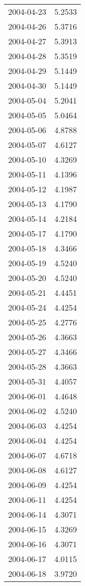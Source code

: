 \begin{tabular}{lr}
2004-04-23 &      5.2533 \\
2004-04-26 &      5.3716 \\
2004-04-27 &      5.3913 \\
2004-04-28 &      5.3519 \\
2004-04-29 &      5.1449 \\
2004-04-30 &      5.1449 \\
2004-05-04 &      5.2041 \\
2004-05-05 &      5.0464 \\
2004-05-06 &      4.8788 \\
2004-05-07 &      4.6127 \\
2004-05-10 &      4.3269 \\
2004-05-11 &      4.1396 \\
2004-05-12 &      4.1987 \\
2004-05-13 &      4.1790 \\
2004-05-14 &      4.2184 \\
2004-05-17 &      4.1790 \\
2004-05-18 &      4.3466 \\
2004-05-19 &      4.5240 \\
2004-05-20 &      4.5240 \\
2004-05-21 &      4.4451 \\
2004-05-24 &      4.4254 \\
2004-05-25 &      4.2776 \\
2004-05-26 &      4.3663 \\
2004-05-27 &      4.3466 \\
2004-05-28 &      4.3663 \\
2004-05-31 &      4.4057 \\
2004-06-01 &      4.4648 \\
2004-06-02 &      4.5240 \\
2004-06-03 &      4.4254 \\
2004-06-04 &      4.4254 \\
2004-06-07 &      4.6718 \\
2004-06-08 &      4.6127 \\
2004-06-09 &      4.4254 \\
2004-06-11 &      4.4254 \\
2004-06-14 &      4.3071 \\
2004-06-15 &      4.3269 \\
2004-06-16 &      4.3071 \\
2004-06-17 &      4.0115 \\
2004-06-18 &      3.9720 \\

\end{tabular}

